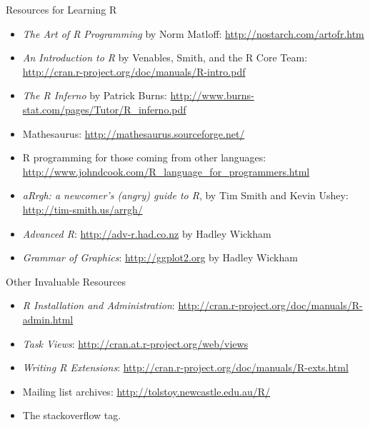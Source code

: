 \begin{frame}
  \begin{block}{Resources for Learning R}\pause
  \begin{itemize}[<+-|alert@+>]
    \item \emph{The Art of R Programming} by Norm Matloff:
\url{http://nostarch.com/artofr.htm}\\[.2cm]

    \item \emph{An Introduction to R} by Venables, Smith, and the R Core Team:
\url{http://cran.r-project.org/doc/manuals/R-intro.pdf}\\[.2cm]

    \item \emph{The R Inferno} by Patrick Burns:
\url{http://www.burns-stat.com/pages/Tutor/R_inferno.pdf}\\[.2cm]

    \item Mathesaurus:  \url{http://mathesaurus.sourceforge.net/}\\[.2cm]

    \item R programming for those coming from other languages:
\url{http://www.johndcook.com/R_language_for_programmers.html}\\[.2cm]

    \item \emph{aRrgh: a newcomer's (angry) guide to R}, by Tim Smith and Kevin
Ushey:
    \url{http://tim-smith.us/arrgh/}
    \item \emph{Advanced R}: \url{http://adv-r.had.co.nz} by Hadley Wickham
    \item \emph{Grammar of Graphics}: \url{http://ggplot2.org} by Hadley Wickham
  \end{itemize}
\end{block}
\end{frame}


\begin{frame}
  \begin{block}{Other Invaluable Resources}\pause
    \begin{itemize}[<+-|alert@+>]
    \item \emph{R Installation and Administration}:
      \url{http://cran.r-project.org/doc/manuals/R-admin.html}
    \item \emph{Task Views}:
      \url{http://cran.at.r-project.org/web/views}
    \item \emph{Writing R Extensions}:
      \url{http://cran.r-project.org/doc/manuals/R-exts.html}
    \item Mailing list archives: \url{http://tolstoy.newcastle.edu.au/R/}
    \item The \code{[R]} stackoverflow tag.
    \end{itemize}
  \end{block}
\end{frame}



